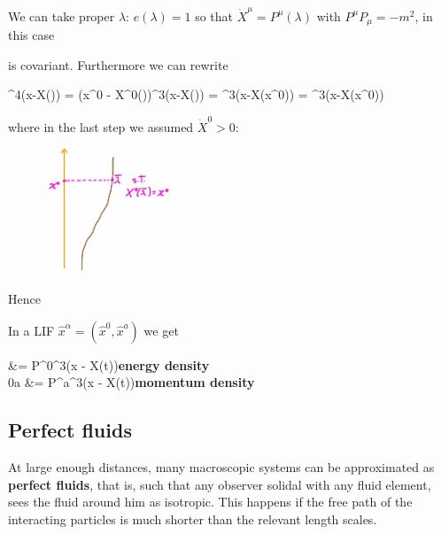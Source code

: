 \documentclass[../main/main.tex]{subfiles}
\begin{document}
We can take proper $\lambda$: $e(\lambda) = 1$ so that $\dot X^\mu = P^\mu(\lambda)$ with $P^\mu P_\mu = -m^2$, in this case 
\begin{eqalign}\end{eqalign}
is covariant.  Furthermore we can rewrite
\begin{eqalign}
	\delta^4(x-X(\lambda)) = \delta(x^0 - X^0(\lambda))\delta^3(\vec x-\vec X(\lambda)) = \delta^3(\vec x-\vec X(x^0)) = \delta^3(\vec x-\vec X(x^0))
\end{eqalign}
where in the last step we assumed $\dot X^0>0$: 
\begin{figure}[H]
\centering
\includegraphics[width=4cm]{../img/delta_rewr_iemt_interp.jpg}
\end{figure}
\noindent
Hence
\begin{eqalign}\end{eqalign}
In a LIF $\hat x^\alpha = (\hat x^0, \hat x^a)$ we get
\begin{eqalign}
	 &= \hat P^0\delta^3(\vec x - \vec X(t))\quad\textbf{energy density}\\
	\hiemt0a &= \hat P^a\delta^3(\vec x - \vec X(t))\quad\textbf{momentum density}
\end{eqalign}

\subsection{Perfect fluids}

At large enough distances, many macroscopic systems can be approximated as \textbf{perfect fluids}, that is, such that any observer solidal with any fluid element, sees the fluid around him as isotropic. This happens if the free path of the interacting particles is much shorter than the relevant length scales. 
\end{document}
